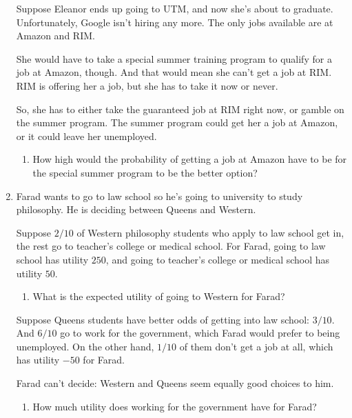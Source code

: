 \documentclass[justified]{tufte-book}
\providecommand{\tightlist}{%
  \setlength{\itemsep}{0pt}\setlength{\parskip}{0pt}}
\theoremstyle{definition}
\theoremstyle{definition}
\theoremstyle{definition}
\theoremstyle{remark}
\begin{document}
\begin{enumerate}
  Suppose Eleanor ends up going to UTM, and now she's about to graduate.
  Unfortunately, Google isn't hiring any more. The only jobs available
  are at Amazon and RIM.

  She would have to take a special summer training program to qualify
  for a job at Amazon, though. And that would mean she can't get a job
  at RIM. RIM is offering her a job, but she has to take it now or
  never.

  So, she has to either take the guaranteed job at RIM right now, or
  gamble on the summer program. The summer program could get her a job
  at Amazon, or it could leave her unemployed.

  \begin{enumerate}
  \def\labelenumii{\alph{enumii}.}
  \setcounter{enumii}{2}
  \tightlist
  \item
    How high would the probability of getting a job at Amazon have to be
    for the special summer program to be the better option?
  \end{enumerate}
\item
  Farad wants to go to law school so he's going to university to study
  philosophy. He is deciding between Queens and Western.

  Suppose \(2/10\) of Western philosophy students who apply to law
  school get in, the rest go to teacher's college or medical school. For
  Farad, going to law school has utility \(250\), and going to teacher's
  college or medical school has utility \(50\).

  \begin{enumerate}
  \def\labelenumii{\alph{enumii}.}
  \tightlist
  \item
    What is the expected utility of going to Western for Farad?
  \end{enumerate}

  Suppose Queens students have better odds of getting into law school:
  \(3/10\). And \(6/10\) go to work for the government, which Farad
  would prefer to being unemployed. On the other hand, \(1/10\) of them
  don't get a job at all, which has utility \(-50\) for Farad.

  Farad can't decide: Western and Queens seem equally good choices to
  him.

  \begin{enumerate}
  \def\labelenumii{\alph{enumii}.}
  \setcounter{enumii}{1}
  \tightlist
  \item
    How much utility does working for the government have for Farad?
  \end{enumerate}


\end{enumerate}
\end{document}
